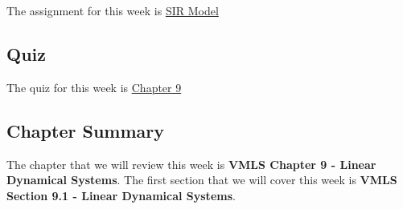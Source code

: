 The assignment for this week is \href{https://github.com/QuantumCompiler/CU/tree/main/CSPB%202820%20-%20Linear%20Algebra%20With%20Computer%20Science%20Applications/CSPB%202820%20-%20Assignments/CSPB%202820%20-%20Assignment%209%20-%20SIR%20Model}{SIR Model}  

\subsection{Quiz}

The quiz for this week is \href{https://applied.cs.colorado.edu/mod/quiz/view.php?id=50777}{Chapter 9}  

\subsection{Chapter Summary}

The chapter that we will review this week is \textbf{VMLS Chapter 9 - Linear Dynamical Systems}. The first section that we will cover this week is \textbf{VMLS Section 9.1 - Linear Dynamical Systems}.

